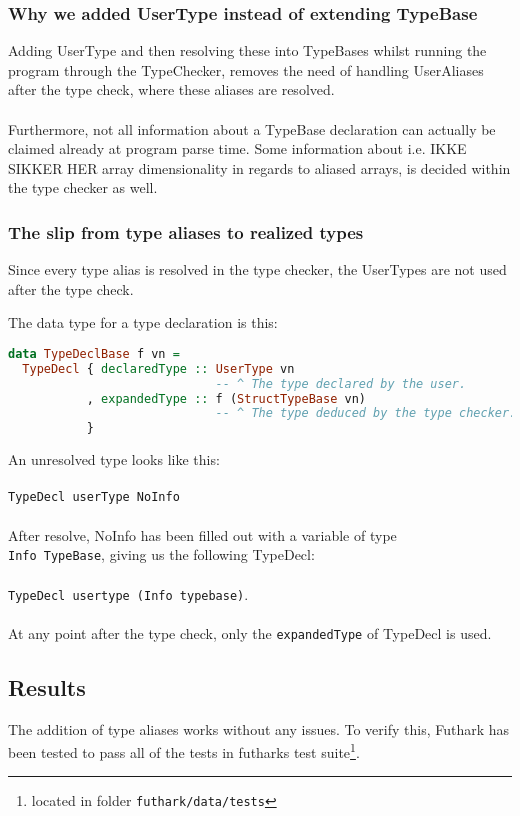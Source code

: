 \subsubsection{Why we added UserType instead of extending TypeBase}
Adding UserType and then resolving these into TypeBases whilst running the
program through the TypeChecker, removes the need of handling UserAliases after
the type check, where these aliases are resolved.
\\\\
\label{typeclarification}Furthermore, not all information about a TypeBase declaration
can actually be claimed already at program parse time.
Some information about i.e. IKKE SIKKER HER array dimensionality in regards to aliased arrays, is decided within the type
checker as well. 

\subsubsection{The slip from type aliases to realized types}
Since every type alias is resolved in the type checker, the UserTypes are not
used after the type check.

The data type for a type declaration is this:
\begin{lstlisting}[language=Haskell]
data TypeDeclBase f vn =
  TypeDecl { declaredType :: UserType vn
                             -- ^ The type declared by the user.
           , expandedType :: f (StructTypeBase vn)
                             -- ^ The type deduced by the type checker.
           }
\end{lstlisting}
An unresolved type looks like this:\\\\
\indent \texttt{TypeDecl userType NoInfo}\\
\\
After resolve, NoInfo has been filled out with a variable of type\\
\texttt{Info TypeBase}, giving us the following TypeDecl:\\\\
\indent \texttt{TypeDecl usertype (Info typebase)}.\\
\\
At any point after the type check, only the \texttt{expandedType} of TypeDecl is used.

\subsection{Results}
The addition of type aliases works without any issues.
To verify this, Futhark has been tested to pass all of the tests in futharks
test suite\footnote{located in folder \texttt{futhark/data/tests}}.

